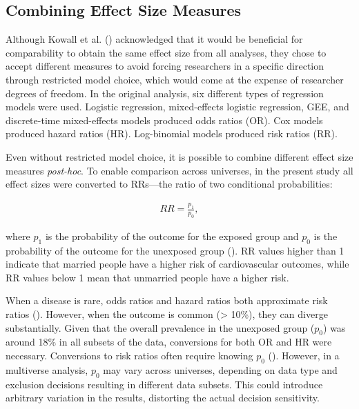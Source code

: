 \documentclass[
  man,
  floatsintext,
  longtable,
  nolmodern,
  notxfonts,
  notimes,
  colorlinks=true,linkcolor=blue,citecolor=blue,urlcolor=blue]{apa7}
\begin{document}
\newpage

\subsection{Combining Effect Size
Measures}\label{combining-effect-size-measures}

Although Kowall et al. ()
acknowledged that it would be beneficial for comparability to obtain the
same effect size from all analyses, they chose to accept different
measures to avoid forcing researchers in a specific direction through
restricted model choice, which would come at the expense of researcher
degrees of freedom. In the original analysis, six different types of
regression models were used. Logistic regression, mixed-effects logistic
regression, GEE, and discrete-time mixed-effects models produced odds
ratios (OR). Cox models produced hazard ratios (HR). Log-binomial models
produced risk ratios (RR).

Even without restricted model choice, it is possible to combine
different effect size measures \emph{post-hoc}. To enable comparison
across universes, in the present study all effect sizes were converted
to RRs---the ratio of two conditional probabilities:

\begin{align}
  RR = \frac{p_1}{p_0},
\end{align}

where \(p_1\) is the probability of the outcome for the exposed group
and \(p_0\) is the probability of the outcome for the unexposed group
().
RR values higher than 1 indicate that married people have a higher risk
of cardiovascular outcomes, while RR values below 1 mean that unmarried
people have a higher risk.

When a disease is rare, odds ratios and hazard ratios both approximate
risk ratios (). However, when the outcome is common (\textgreater{} 10\%), they
can diverge substantially. Given that the overall prevalence in the
unexposed group (\(p_0\)) was around 18\% in all subsets of the data,
conversions for both OR and HR were necessary. Conversions to risk
ratios often require knowing \(p_0\)
(). However, in a
multiverse analysis, \(p_0\) may vary across universes, depending on
data type and exclusion decisions resulting in different data subsets.
This could introduce arbitrary variation in the results, distorting the
actual decision sensitivity.
\end{document}
